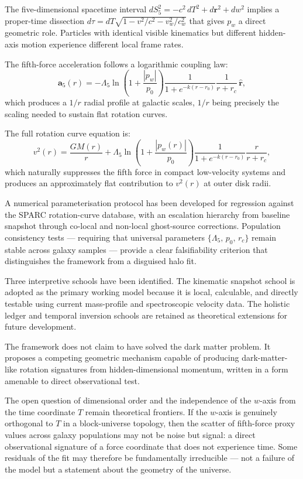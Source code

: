 \documentclass[11pt,a4paper]{article}
\newcommand{\pw}{p_w}                        %
\newcommand{\Lf}{\Lambda_5}                  %
\newcommand{\afive}{\mathbf{a}_5}            %
\newcommand{\rhat}{\hat{\mathbf{r}}}         %
\begin{document}
The five-dimensional spacetime interval $dS_5^2 = -c^2\,dT^2 + d\mathbf{r}^2 + dw^2$
implies a proper-time dissection $d\tau = dT\sqrt{1 - v^2/c^2 - v_w^2/c_w^2}$
that gives $\pw$ a direct geometric role.  Particles with identical visible
kinematics but different hidden-axis motion experience different local frame
rates.

The fifth-force acceleration follows a logarithmic coupling law:
\[
  \afive(r) = -\Lf\ln\!\left(1+\frac{|\pw|}{p_0}\right)
  \frac{1}{1+e^{-k(r-r_0)}} \frac{1}{r+r_c}\,\rhat ,
\]
which produces a $1/r$ radial profile at galactic scales, $1/r$ being
precisely the scaling needed to sustain flat rotation curves.

The full rotation curve equation is:
\[
  v^2(r) = \frac{GM(r)}{r}
  + \Lf\ln\!\left(1+\frac{|\pw(r)|}{p_0}\right)
    \frac{1}{1+e^{-k(r-r_0)}} \frac{r}{r+r_c} ,
\]
which naturally suppresses the fifth force in compact low-velocity systems
and produces an approximately flat contribution to $v^2(r)$ at outer disk
radii.

A numerical parameterisation protocol has been developed for regression against
the SPARC rotation-curve database, with an escalation hierarchy from baseline
snapshot through co-local and non-local ghost-source corrections.  Population
consistency tests --- requiring that universal parameters $\{\Lf,\,p_0,\,r_c\}$
remain stable across galaxy samples --- provide a clear falsifiability criterion
that distinguishes the framework from a disguised halo fit.

Three interpretive schools have been identified.  The kinematic snapshot school
is adopted as the primary working model because it is local, calculable, and
directly testable using current mass-profile and spectroscopic velocity data.
The holistic ledger and temporal inversion schools are retained as theoretical
extensions for future development.

The framework does not claim to have solved the dark matter problem.  It
proposes a competing geometric mechanism capable of producing dark-matter-like
rotation signatures from hidden-dimensional momentum, written in a form
amenable to direct observational test.

\bigskip

The open question of dimensional order and the independence of the $w$-axis
from the time coordinate $T$ remain theoretical frontiers.  If the $w$-axis
is genuinely orthogonal to $T$ in a block-universe topology, then the scatter
of fifth-force proxy values across galaxy populations may not be noise but
signal: a direct observational signature of a force coordinate that does not
experience time.  Some residuals of the fit may therefore be fundamentally
irreducible --- not a failure of the model but a statement about the geometry
of the universe.
\end{document}
